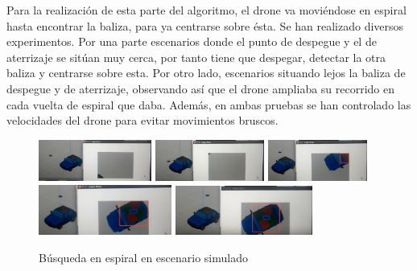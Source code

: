 \hspace{1cm} Para la realizaci\'on de esta parte del algoritmo, el drone va movi\'endose en espiral hasta encontrar la baliza, para ya centrarse sobre \'esta. Se han realizado diversos experimentos. Por una parte escenarios donde el punto de despegue y el de aterrizaje se sit\'uan muy cerca, por tanto tiene que despegar, detectar la otra baliza y centrarse sobre esta. Por otro lado, escenarios situando lejos la baliza de despegue y de aterrizaje, observando as\'i que el drone ampliaba su recorrido en cada vuelta de espiral que daba. Adem\'as, en ambas pruebas se han controlado las velocidades del drone para evitar movimientos bruscos. 


\begin{figure}[H]
 \centering
    \includegraphics[width=0.33\textwidth]{imgs/busqueda1.jpg}
    \includegraphics[width=0.32\textwidth]{imgs/busqueda3.jpg}
    \includegraphics[width=0.29\textwidth]{imgs/busqueda5.jpg}\\
    \includegraphics[width=0.39\textwidth]{imgs/busqueda6.jpg}
    \includegraphics[width=0.4\textwidth]{imgs/busqueda7.jpg}
 \caption{B\'usqueda en espiral en escenario simulado}
 \label{f:Busqueda sobre el simulador}
\end{figure}



